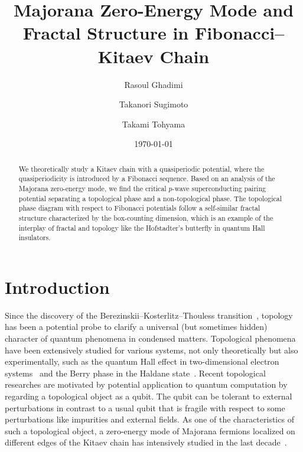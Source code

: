\documentclass[%
superscriptaddress,
preprint,
amsmath,amssymb,
]{revtex4-1}
\begin{document}
	\title{Majorana Zero-Energy Mode and Fractal Structure in Fibonacci--Kitaev Chain}
	\author{Rasoul Ghadimi}
	\author{Takanori Sugimoto}
	\author{Takami Tohyama}
	\date{\today}
\begin{abstract}
	We theoretically study a Kitaev chain with a quasiperiodic potential, where the quasiperiodicity is introduced by a Fibonacci sequence.
	Based on an analysis of the Majorana zero-energy mode, we find  the critical $p$-wave superconducting pairing potential separating a topological phase and a non-topological phase.
	The topological phase diagram with respect to Fibonacci potentials follow a self-similar fractal structure characterized by the box-counting dimension, which is an example of the interplay of fractal and topology like the Hofstadter's butterfly in quantum Hall insulators.
\end{abstract}
\maketitle
\section{Introduction}
Since the discovery of the Berezinskii--Kosterlitz--Thouless transition~\cite{Berezinskii71,Kosterlitz73}, topology has been a potential probe to clarify a universal (but sometimes hidden) character of quantum phenomena in condensed matters.
Topological phenomena have been extensively studied for various systems, not only theoretically but also experimentally, such as the quantum Hall effect in two-dimensional electron systems~\cite{Klitzing80, Thouless82} and the Berry phase in the Haldane state~\cite{Haldane83, Affleck87, Hirano08}.
Recent topological researches are motivated by potential application to quantum computation by regarding a topological object as a qubit.
The qubit can be tolerant to external perturbations in contrast to a usual qubit that is fragile with respect to some perturbations like impurities and external fields.
As one of the characteristics of such a topological object, a zero-energy mode of Majorana fermions localized on different edges of the Kitaev chain has intensively studied in the last decade~\cite{Kitaev01,Wilczek09}.
\end{document}
